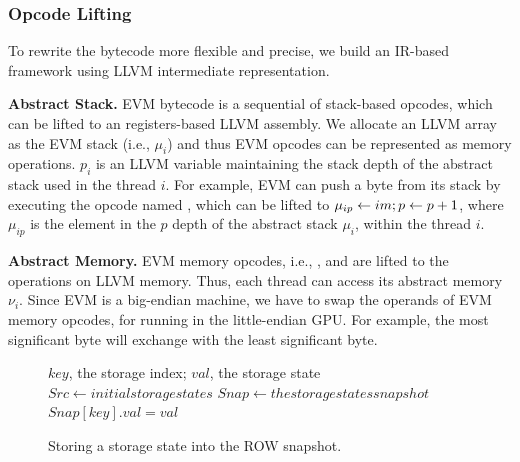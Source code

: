 
\subsubsection{Opcode Lifting}
To rewrite the bytecode more flexible and precise, we build an IR-based framework using LLVM intermediate representation\cite{lattner2004llvm}.

\noindent\textbf{Abstract Stack.}
EVM bytecode is a sequential of stack-based opcodes, which can be lifted to an registers-based LLVM assembly. 
We allocate an LLVM array as the EVM stack (i.e., $\mu_i$) and thus EVM opcodes can be represented as memory operations.
$p_i$ is an LLVM variable maintaining the stack depth of the abstract stack used in the thread $i$.
For example, EVM can push a byte from its stack by executing the opcode named , which can be lifted to $\mu_{ip} \gets \code{im}; p \gets p+1$, where $\mu_{ip}$ is the element in the $p$ depth of the abstract stack $\mu_i$, within the thread $i$.


\noindent\textbf{Abstract Memory.}
EVM memory opcodes, i.e., ,  and  are lifted to the operations on LLVM memory. 
Thus, each thread can access its abstract memory $\nu_i$.
Since EVM is a big-endian machine, we have to swap the operands of EVM memory opcodes, for running in the little-endian GPU.
For example, the most significant byte will exchange with the 
least significant byte.

\begin{figure}[t]
\begin{algorithm}[H]
\caption{Storing a storage state into the ROW snapshot.}
\label{algo:row_sstore}
\begin{algorithmic}[1]
    \Require $key$, the storage index; $val$, the storage state
    \State $Src \gets initial storage states$
    \State $Snap \gets the storage states snapshot$
        \State $Snap[key].val = val$
        \State \Return
    \EndIf
\end{algorithmic}
\end{algorithm}
\end{figure}

